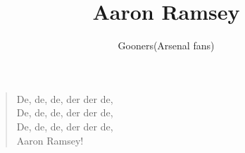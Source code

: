 \documentclass[a4paper,12pt]{article}
\title{Aaron Ramsey}
\author{Gooners(Arsenal fans)}
\date{}
\begin{document}
	
	\maketitle
	
	\begin{verse}
		
		De, de, de, der der de, \\
		De, de, de, der der de, \\
		De, de, de, der der de, \\
		Aaron Ramsey!
		
	\end{verse}
	
\end{document}
